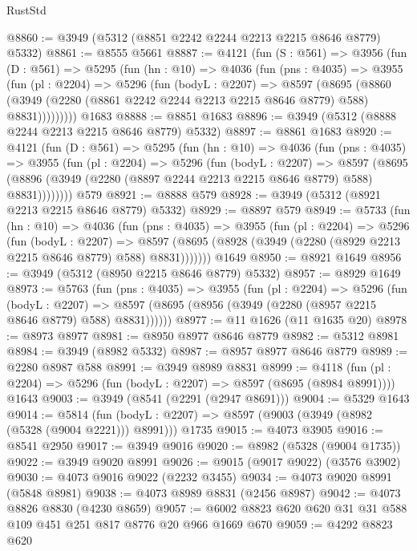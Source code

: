 \begin{lexlean}{RustStd}
\begin{coremodule}
@8860 := @3949 (@5312 (@8851 @2242 @2244 @2213 @2215 @8646 @8779) @5332)
@8861 := @8555 @5661
@8887 := @4121
    (fun (S : @561) =>
    @3956
      (fun (D : @561) =>
      @5295
        (fun (hn : @10) =>
        @4036
          (fun (pns : @4035) =>
          @3955
            (fun (pl : @2204) =>
            @5296
              (fun (bodyL : @2207) =>
              @8597
                (@8695
                  (@8860
                    (@3949 (@2280 (@8861 @2242 @2244 @2213 @2215 @8646 @8779) @588) @8831)))))))))
    @1683
@8888 := @8851 @1683
@8896 := @3949 (@5312 (@8888 @2244 @2213 @2215 @8646 @8779) @5332)
@8897 := @8861 @1683
@8920 := @4121
    (fun (D : @561) =>
    @5295
      (fun (hn : @10) =>
      @4036
        (fun (pns : @4035) =>
        @3955
          (fun (pl : @2204) =>
          @5296
            (fun (bodyL : @2207) =>
            @8597
              (@8695 (@8896 (@3949 (@2280 (@8897 @2244 @2213 @2215 @8646 @8779) @588) @8831))))))))
    @579
@8921 := @8888 @579
@8928 := @3949 (@5312 (@8921 @2213 @2215 @8646 @8779) @5332)
@8929 := @8897 @579
@8949 := @5733
    (fun (hn : @10) =>
    @4036
      (fun (pns : @4035) =>
      @3955
        (fun (pl : @2204) =>
        @5296
          (fun (bodyL : @2207) =>
          @8597 (@8695 (@8928 (@3949 (@2280 (@8929 @2213 @2215 @8646 @8779) @588) @8831)))))))
    @1649
@8950 := @8921 @1649
@8956 := @3949 (@5312 (@8950 @2215 @8646 @8779) @5332)
@8957 := @8929 @1649
@8973 := @5763
    (fun (pns : @4035) =>
    @3955
      (fun (pl : @2204) =>
      @5296
        (fun (bodyL : @2207) =>
        @8597 (@8695 (@8956 (@3949 (@2280 (@8957 @2215 @8646 @8779) @588) @8831))))))
@8977 := @11 @1626 (@11 @1635 @20)
@8978 := @8973 @8977
@8981 := @8950 @8977 @8646 @8779
@8982 := @5312 @8981
@8984 := @3949 (@8982 @5332)
@8987 := @8957 @8977 @8646 @8779
@8989 := @2280 @8987 @588
@8991 := @3949 @8989 @8831
@8999 := @4118
    (fun (pl : @2204) => @5296 (fun (bodyL : @2207) => @8597 (@8695 (@8984 @8991))))
    @1643
@9003 := @3949 (@8541 (@2291 (@2947 @8691)))
@9004 := @5329 @1643
@9014 := @5814
    (fun (bodyL : @2207) => @8597 (@9003 (@3949 (@8982 (@5328 (@9004 @2221))) @8991)))
    @1735
@9015 := @4073 @3905
@9016 := @8541 @2950
@9017 := @3949 @9016
@9020 := @8982 (@5328 (@9004 @1735))
@9022 := @3949 @9020 @8991
@9026 := @9015 (@9017 @9022) (@3576 @3902)
@9030 := @4073 @9016 @9022 (@2232 @3455)
@9034 := @4073 @9020 @8991 (@5848 @8981)
@9038 := @4073 @8989 @8831 (@2456 @8987)
@9042 := @4073 @8826 @8830 (@4230 @8659)
@9057 := @6002 @8823 @620 @620 @31 @31 @588 @109 @451 @251 @817 @8776 @20 @966 @1669 @670
@9059 := @4292 @8823 @620

\end{coremodule}
\end{lexlean}
